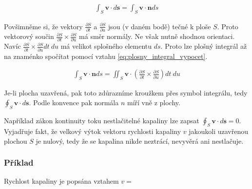 \documentclass{book}
\newcommand{\vect}[1]{\boldsymbol{#1}}
\begin{document}
\begin{equation}
\label{eq:plosny_integral_definice}
\begin{split}
\int_S \vect{v} \cdot d\vect{s} = \int_S \vect{v} \cdot \vect{n} ds
\end{split}
\end{equation}


Povšimněme si, že vektory \(\frac{\partial S}{\partial t}\) a \(\frac{\partial S}{\partial u}\) jsou (v daném bodě) tečné k ploše \(S\). Proto vektorový součin \(\frac{\partial S}{\partial t} \times \frac{\partial S}{\partial u}\) má směr normály. Ne však nutně shodnou orientaci. Navíc \(\frac{\partial S}{\partial t} \times \frac{\partial S}{\partial u} dt \ du\) má velikot splošného elementu \(ds\). Proto lze plošný integrál až na znaménko spočítat pomocí vztahu \eqref{eq:plosny_integral_vypocet}.

\begin{equation}
\label{eq:plosny_integral_vypocet}
\begin{split}
\int_S \vect{v} \cdot \vect{n} ds = \iint_S \vect{v} \cdot \left (\frac{\partial S}{\partial t} \times \frac{\partial S}{\partial u}\right) dt \ du
\end{split}
\end{equation}

Je-li plocha uzavřená, pak toto zdůrazníme kroužkem přes symbol integrálu, tedy \(\oint_S \vect{v} \cdot d\vect{s}\). Podle konvence pak normála \(n\) míří vně z plochy.

Například zákon kontinuity toku nestlačitelné kapaliny lze zapsat \(\oint_S \vect{v} \cdot d\vect{s} = 0\). Vyjadřuje fakt, že velkový výtok vektoru rychlosti kapaliny \(v\) jakoukoli uzavřenou plochou \(S\) je nulový, tedy že se kapalina nikde neztrácí, nevyvěrá ani nestlačuje. 

\subsubsection{Příklad}

Rychlost kapaliny je popsána vztahem \(v = \)

\end{document}
